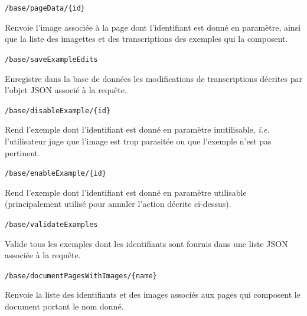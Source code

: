 \begin{description}[align=left]
\item [GET] \texttt{/base/pageData/\{id\}}\newline{}
\begin{itshape}
Renvoie l'image associée à la page dont l'identifiant est donné en paramètre, ainsi que la liste des imagettes et des transcriptions des exemples qui la composent.
\end{itshape}

\item [POST] \texttt{/base/saveExampleEdits}\newline{}
\begin{itshape}
Enregistre dans la base de données les modifications de transcriptions décrites par l'objet JSON associé à la requête.
\end{itshape}

\item [PUT] \texttt{/base/disableExample/\{id\}}\newline{}
\begin{itshape}
Rend l'exemple dont l'identifiant est donné en paramètre inutilisable, \textit{i.e.} l'utilisateur juge que l'image est trop parasitée ou que l'exemple n'est pas pertinent.
\end{itshape}

\item [PUT] \texttt{/base/enableExample/\{id\}}\newline{}
\begin{itshape}
Rend l'exemple dont l'identifiant est donné en paramètre utilisable (principalement utilisé pour annuler l'action décrite ci-dessus).
\end{itshape}

\item [POST] \texttt{/base/validateExamples}\newline{}
\begin{itshape}
Valide tous les exemples dont les identifiants sont fournis dans une liste JSON associée à la requête.
\end{itshape}

\item [Découpe]

\item [GET] \texttt{/base/documentPagesWithImages/\{name\}}\newline{}
\begin{itshape}
Renvoie la liste des identifiants et des images associés aux pages qui composent le document portant le nom donné.
\end{itshape}


\end{description}
